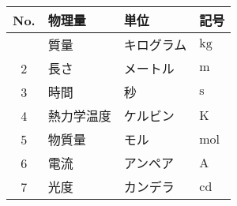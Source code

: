 \begin{tabular}{clll}
 No. & 物理量 & 単位 & 記号 \\
 \hline
 \tblstrut
 1 & 質量 & キログラム & $\mathrm{kg}$ \\
 2 & 長さ & メートル & $\mathrm{m}$ \\
 3 & 時間 & 秒 & $\mathrm{s}$ \\
 4 & 熱力学温度 & ケルビン & $\mathrm{K}$ \\
 5 & 物質量 & モル & $\mathrm{mol}$ \\
 6 & 電流 & アンペア & $\mathrm{A}$ \\
 7 & 光度 & カンデラ & $\mathrm{cd}$ \\
 \hline
\end{tabular}
